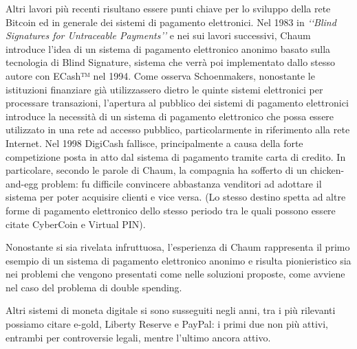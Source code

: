 Altri lavori più recenti risultano essere punti chiave per lo sviluppo della rete Bitcoin ed in generale dei sistemi di pagamento elettronici.
Nel 1983 in \textit{‘‘Blind Signatures for Untraceable Payments’’} e nei sui lavori successivi\cite{K6,K7}, Chaum introduce l’idea di un sistema di pagamento elettronico anonimo basato sulla tecnologia di Blind Signature, sistema che verrà poi implementato dallo stesso autore con ECash™ nel 1994. Come osserva Schoenmakers\cite{K8}, nonostante le istituzioni finanziare già utilizzassero dietro le quinte sistemi elettronici per processare transazioni, l’apertura al pubblico dei sistemi di pagamento elettronici introduce la necessità di un sistema di pagamento elettronico che possa essere utilizzato in una rete ad accesso pubblico, particolarmente in riferimento alla rete Internet. Nel 1998 DigiCash fallisce, principalmente a causa della forte competizione posta in atto dal sistema di pagamento tramite carta di credito. In particolare, secondo le parole di Chaum, la compagnia ha sofferto di un chicken-and-egg problem: fu difficile convincere abbastanza venditori ad adottare il sistema per poter acquisire clienti e vice versa. (Lo stesso destino spetta ad altre forme di pagamento elettronico dello stesso periodo tra le quali possono essere citate CyberCoin e Virtual PIN).

Nonostante si sia rivelata infruttuosa, l’esperienza di Chaum rappresenta il primo esempio di un sistema di pagamento elettronico anonimo e risulta pionieristico sia nei problemi che vengono presentati come nelle soluzioni proposte, come avviene nel caso del problema di double spending. 

Altri sistemi di moneta digitale si sono susseguiti negli anni, tra i più rilevanti possiamo citare e-gold, Liberty Reserve e PayPal: i primi due non più attivi, entrambi per controversie legali, mentre l’ultimo ancora attivo.

